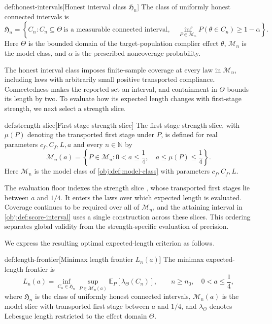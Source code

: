 \begin{definitionv}{def:honest-intervals}[Honest interval class \(\mathfrak H_n\)]
The class of uniformly honest connected intervals is
\[
\mathfrak H_n=
\left\{
C_n:
C_n\subseteq\Theta\ \text{is a measurable connected interval},
\quad
\inf_{P\in\mathcal M_n}P(\theta\in C_n)\ge 1-\alpha
\right\}.
\]
Here \(\Theta\) is the bounded domain of the target-population complier effect \(\theta\), \(\mathcal M_n\) is the model class, and \(\alpha\) is the prescribed noncoverage probability.
\end{definitionv}

The honest interval class  imposes finite-sample coverage at every law in \(\mathcal M_n\), including laws with arbitrarily small positive transported compliance. Connectedness makes the reported set an interval, and containment in \(\Theta\) bounds its length by two. To evaluate how its expected length changes with first-stage strength, we next select a strength slice.

\begin{definitionv}{def:strength-slice}[First-stage strength slice]
The first-stage strength slice, with \(\mu(P)\) denoting the transported first stage under \(P\), is defined for real parameters \(c_f,C_f,L,a\) and every \(n\in\mathbb N\) by
\[
\mathcal M_n(a)
=
\left\{
P\in\mathcal M_n:
0<a\le\frac14,\quad
a\le\mu(P)\le\frac14
\right\}.
\]
Here \(\mathcal M_n\) is the model class of \cref{obj:def:model-class} with parameters \(c_f,C_f,L\).
\end{definitionv}

The evaluation floor  indexes the strength slice , whose transported first stages lie between \(a\) and \(1/4\). It enters the laws over which expected length is evaluated. Coverage continues to be required over all of \(\mathcal M_n\), and the attaining interval in \cref{obj:def:score-interval} uses a single construction across these slices. This ordering separates global validity from the strength-specific evaluation of precision.

We express the resulting optimal expected-length criterion as follows.

\begin{definitionv}{def:length-frontier}[Minimax length frontier \(L_n(a)\)]
The minimax expected-length frontier is
\[
L_n(a)
=
\inf_{C_n\in\mathfrak H_n}
\sup_{P\in\mathcal M_n(a)}
\mathbb E_P\!\left[\lambda_{\Theta}(C_n)\right],
\qquad n\ge n_0,\quad 0<a\le\frac14,
\]
where \(\mathfrak H_n\) is the class of uniformly honest connected intervals, \(\mathcal M_n(a)\) is the model slice with transported first stage between \(a\) and \(1/4\), and \(\lambda_{\Theta}\) denotes Lebesgue length restricted to the effect domain \(\Theta\).
\end{definitionv}

